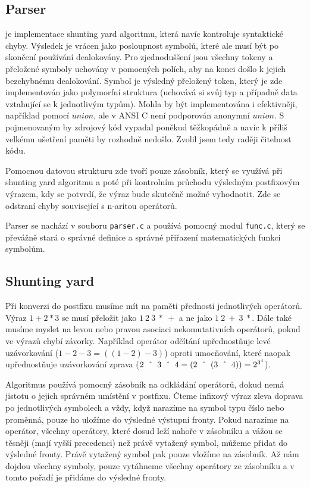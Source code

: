 \documentclass[11pt]{article}
\newcommand\CARET{\mathbin{\char`\^}}
\begin{document}
\subsection{Parser}
je implementace shunting yard algoritmu, která navíc kontroluje syntaktické
chyby. Výsledek je vrácen jako posloupnost symbolů, které ale musí být po
skončení používání dealokovány. Pro zjednoduššení jsou všechny tokeny a
přeložené symboly uchovány v pomocných polích, aby na konci došlo k jejich
bezchybnému dealokování. Symbol je výsledný přeložený token, který je zde
implementován jako polymorfní struktura (uchovává si svůj typ a případně data
vztahující se k jednotlivým typům). Mohla by být implementována i efektivněji,
například pomocí $union$, ale v ANSI C není podporován anonymní $union$. S
pojmenovaným by zdrojový kód vypadal poněkud těžkopádně a navíc k příliš
velkému ušetření paměti by rozhodně nedošlo. Zvolil jsem tedy raději čitelnost
kódu. 

Pomocnou datovou strukturu zde tvoří pouze zásobník, který se využívá při
shunting yard algoritmu a poté při kontrolním průchodu výsledným postfixovým
výrazem, kdy se potvrdí, že výraz bude skutečně možné vyhodnotit. Zde se
odstraní chyby související s n-aritou operátorů.

Parser se nachází v souboru \texttt{parser.c} a používá pomocný modul
\texttt{func.c}, který se převážně stará o správné definice a správné přiřazení
matematických funkcí symbolům.

\subsection{Shunting yard}
Při konverzi do postfixu musíme mít na paměti přednosti jednotlivých operátorů.
Výraz $1 + 2 * 3$ se musí přeložit jako $1~2~3~*~+$ a ne jako $1~2~+~3~*$.
Dále také musíme myslet na levou nebo pravou asociaci nekomutativních
operátorů, pokud ve výrazů chybí závorky.  Například operátor odčítání
upřednostňuje levé uzávorkování ($1
- 2 - 3 = ((1 - 2) - 3)$) oproti umocňování, které naopak upřednostňuje
  uzávorkování zprava ($2~\CARET~3~\CARET~4 = (2~\CARET~(3~\CARET~4)) =
2^{3^4}$).

Algoritmus používá pomocný zásobník na odkládání operátorů, dokud nemá jistotu
o jejich správném umístění v postfixu. Čteme infixový výraz zleva doprava po
jednotlivých symbolech a vždy, když narazíme na symbol typu číslo nebo proměnná,
pouze ho uložíme do výsledné výstupní fronty. Pokud narazíme na operátor,
všechny operátory, které dosud leží nahoře v zásobníku a vážou se těsněji (mají
vyšší precedenci) než právě vytažený symbol, můžeme přidat do výsledné fronty.
Právě vytažený symbol pak pouze vložíme na zásobník. Až nám dojdou všechny
symboly, pouze vytáhneme všechny operátory ze zásobníku a v tomto pořadí je
přidáme do výsledné fronty. \\
\end{document}

